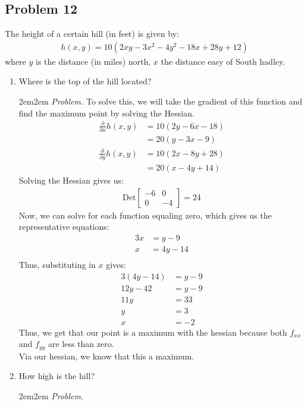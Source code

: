 \documentclass[10pt,oneside]{book}
\newcommand{\gspc}{\vspace{0.13cm}} %
\newcommand{\gline}[0]{\gspc\\} %
\newcommand{\prt}[2]{\frac{\partial#1}{\partial#2}}
\let\endoldproof\endproof
\newenvironment{problem}[1]
  {\vspace{-0.1cm}\begin{coloredadjust}\begin{adjustwidth}{2em}{2em}
   \textit{Problem. }#1}
  {\endoldproof
\end{adjustwidth}\end{coloredadjust}\gspc}
\begin{document}
\subsection*{Problem 12}
The height of a certain hill (in feet) is given by:
\begin{align*}
  h(x,y) = 10(2xy - 3x^2 - 4y^2 - 18x + 28y +12)
\end{align*}
where $y$ is the distance (in miles) north, $x$ the distance easy of South hadley.
\begin{enumerate}
  \item Where is the top of the hill located?
  \begin{problem}
    To solve this, we will take the gradient of this function and find the maximum point by solving the Hessian.
    \begin{align*}
      \prt{}{x}h(x,y) &= 10(2y - 6x - 18)\\
      &= 20(y - 3x - 9)\\
      \prt{}yh(x,y)&= 10(2x - 8y + 28)\\
      &= 20(x - 4y + 14)
    \end{align*}
    Solving the Hessian gives us:
    \begin{align*}
      \text{Det}\begin{bmatrix}
        -6 & 0\\
        0&-4
      \end{bmatrix}=24
    \end{align*}
    Now, we can solve for each function equaling zero, which gives us the representative equations:
    \begin{align*}
      3x &= y - 9\\
      x &= 4y -14\\
    \end{align*}
    Thus, substituting in $x$ gives:
    \begin{align*}
      3(4y-14)&= y -9\\
      12y - 42 &= y - 9\\
      11y &= 33\\
      y &= 3\\
      x &= -2
    \end{align*}
    Thus, we get that our point is a maximum with the hessian because both $f_{xx}$ and $f_{yy}$ are less than zero.\gline{}
    Via our hessian, we know that this a maximum. 
  \end{problem}
  \item How high is the hill?
  \begin{problem}

\end{problem}
\end{enumerate}
\end{document}
